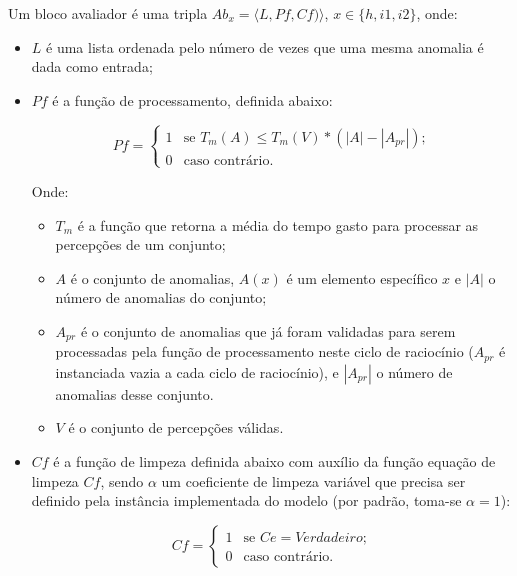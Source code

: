 \begin{definition}
    Um bloco avaliador é uma tripla $Ab_{x} = \langle L, Pf, Cf) \rangle$, $x \in \{h, i1, i2\}$, onde:

    \begin{itemize}
        \item $L$ é uma lista ordenada pelo número de vezes que uma mesma anomalia é dada como entrada;
        \item $Pf$ é a função de processamento, definida abaixo:
            
             \[ Pf = \left\{ \begin{array}{ll}
                        1 & \mbox{se $T_{m}(A) \leq T_{m}(V) * (|A| - |A_{pr}|)$;}\\
                        0 & \mbox{caso contrário}.\end{array} \right. \]
        
            
            Onde:
            
            \begin{itemize}
                \item $T_{m}$ é a função que retorna a média do tempo gasto para processar as percepções de um conjunto;
                \item $A$ é o conjunto de anomalias, $A(x)$ é um elemento específico $x$ e $|A|$ o número de anomalias do conjunto;
                \item $A_{pr}$ é o conjunto de anomalias que já foram validadas para serem processadas pela função de processamento neste ciclo de raciocínio ($A_{pr}$ é instanciada vazia a cada ciclo de raciocínio), e $|A_{pr}|$ o número de anomalias desse conjunto.
                \item $V$ é o conjunto de percepções válidas.
            \end{itemize}{}
        
        \item $Cf$ é a função de limpeza definida abaixo com auxílio da função equação de limpeza $Cf$, sendo $\alpha$ um coeficiente de limpeza variável que precisa ser definido pela instância implementada do modelo (por padrão, toma-se $\alpha = 1$):
        
        \[ Cf = \left\{ \begin{array}{ll}
                        1 & \mbox{se  $Ce = Verdadeiro$;}\\
                        0 & \mbox{caso contrário}.\end{array} \right. \]
            

\end{itemize}
\end{definition}
